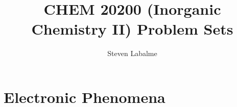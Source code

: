 \documentclass[titlepage]{article}
\title{CHEM 20200 (Inorganic Chemistry II) Problem Sets}
\author{Steven Labalme}
\begin{document}
\maketitle



\tableofcontents
\newpage



\pagestyle{main}
\renewcommand{\leftmark}{Homework \thesection}
\section{Electronic Phenomena}

\newpage



\renewcommand{\leftmark}{References}
\printbibliography[heading=bibintoc]
\end{document}
